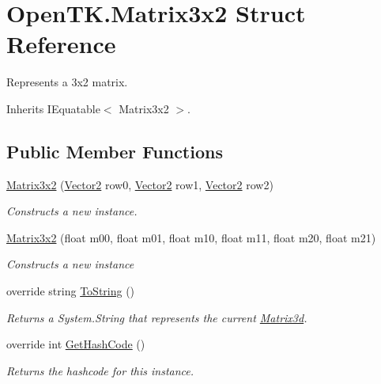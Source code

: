 \hypertarget{struct_open_t_k_1_1_matrix3x2}{\section{Open\-T\-K.\-Matrix3x2 Struct Reference}
\label{struct_open_t_k_1_1_matrix3x2}
}


Represents a 3x2 matrix.  




Inherits I\-Equatable$<$ Matrix3x2 $>$.

\subsection*{Public Member Functions}
\begin{DoxyCompactItemize}
\item 
\hyperlink{struct_open_t_k_1_1_matrix3x2_abf3add42ca5e5d2e0e50e2d92b47f116}{Matrix3x2} (\hyperlink{struct_open_t_k_1_1_vector2}{Vector2} row0, \hyperlink{struct_open_t_k_1_1_vector2}{Vector2} row1, \hyperlink{struct_open_t_k_1_1_vector2}{Vector2} row2)
\begin{DoxyCompactList}\small\item\em Constructs a new instance. \end{DoxyCompactList}\item 
\hyperlink{struct_open_t_k_1_1_matrix3x2_a740af62b2e5356962cd2ca4d671c36ad}{Matrix3x2} (float m00, float m01, float m10, float m11, float m20, float m21)
\begin{DoxyCompactList}\small\item\em Constructs a new instance \end{DoxyCompactList}\item 
override string \hyperlink{struct_open_t_k_1_1_matrix3x2_a407f3a528ee2db738cf010777b21db5f}{To\-String} ()
\begin{DoxyCompactList}\small\item\em Returns a System.\-String that represents the current \hyperlink{struct_open_t_k_1_1_matrix3d}{Matrix3d}. \end{DoxyCompactList}\item 
override int \hyperlink{struct_open_t_k_1_1_matrix3x2_aaab1c3c1bafd5ee3f08672eb612ed1e4}{Get\-Hash\-Code} ()
\begin{DoxyCompactList}\small\item\em Returns the hashcode for this instance. \end{DoxyCompactList}\item 

\end{DoxyCompactItemize}
